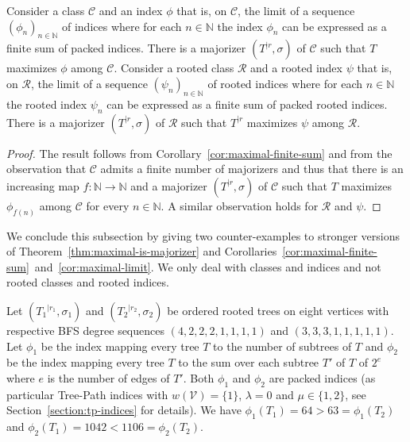 \documentclass[11 pt]{modarticle}
\newcommand{\cN}{\mathbb{N}}
\newcommand{\vset}{\mathcal{V}}
\newcommand{\wmap}{w}
\newcommand{\rtree}[2]{{#1}^{\lvert #2}}
\newcommand{\ortree}[3]{(\rtree{#1}{#2},{#3})}
\newcommand{\tclass}{\mathcal{C}}
\newcommand{\rtclass}{\mathcal{R}}
\begin{document}
\begin{cor}\label{cor:maximal-limit}
Consider a class $\tclass$ and an index $\phi$ that is, on $\tclass$, the limit of a sequence $(\phi_n)_{n \in \cN}$ of indices where for each $n \in \cN$ the index $\phi_n$ can be expressed as a finite sum of packed indices. There is a majorizer $\ortree{T}{r}{\sigma}$ of $\tclass$ such that $T$ maximizes $\phi$ among $\tclass$. Consider a rooted class $\rtclass$ and a rooted index $\psi$ that is, on $\rtclass$, the limit of a sequence $(\psi_n)_{n \in \cN}$ of rooted indices where for each $n \in \cN$ the rooted index $\psi_n$ can be expressed as a finite sum of packed rooted indices. There is a majorizer $\ortree{T}{r}{\sigma}$ of $\rtclass$ such that $\rtree{T}{r}$ maximizes $\psi$ among $\rtclass$.
\end{cor}

\begin{proof}
The result follows from Corollary~\ref{cor:maximal-finite-sum} and from the observation that $\tclass$ admits a finite number of majorizers and thus that there is an increasing map $f : \cN \to \cN$ and a majorizer $\ortree{T}{r}{\sigma}$ of $\tclass$ such that $T$ maximizes $\phi_{f(n)}$ among $\tclass$ for every $n \in \cN$. A similar observation holds for $\rtclass$ and $\psi$.
\end{proof}

We conclude this subsection by giving two counter-examples to stronger versions of Theorem~\ref{thm:maximal-is-majorizer} and Corollaries~\ref{cor:maximal-finite-sum}~and~\ref{cor:maximal-limit}. We only deal with classes and indices and not rooted classes and rooted indices.

Let $\ortree{T_1}{r_1}{\sigma_1}$ and $\ortree{T_2}{r_2}{\sigma_2}$ be ordered rooted trees on eight vertices with respective BFS degree sequences $(4, 2, 2, 2, 1, 1, 1, 1)$ and $(3, 3, 3, 1, 1, 1, 1, 1)$. Let $\phi_1$ be the index mapping every tree $T$ to the number of subtrees of $T$ and $\phi_2$ be the index mapping every tree $T$ to the sum over each subtree $T'$ of $T$ of $2^e$ where $e$ is the number of edges of $T'$. Both $\phi_1$ and $\phi_2$ are packed indices (as particular Tree-Path indices with $\wmap(\vset) = \{1\}$, $\lambda = 0$ and $\mu \in \{1,2\}$, see Section~\ref{section:tp-indices} for details). We have $\phi_1(T_1) = 64 > 63 = \phi_1(T_2)$ and $\phi_2(T_1) = 1042 < 1106 = \phi_2(T_2)$.
\end{document}

